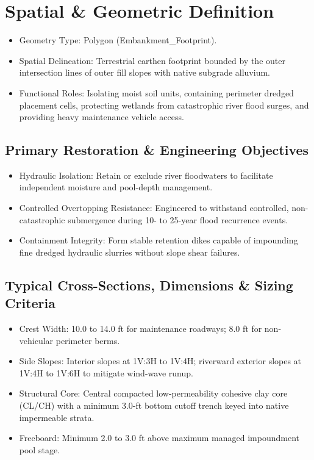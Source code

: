 \documentclass[
  letterpaper,
  DIV=11,
  numbers=noendperiod]{scrreprt}
\begin{document}
\section{Spatial \& Geometric
Definition}\label{spatial-geometric-definition-1}

\begin{itemize}
\item
  Geometry Type: Polygon (Embankment\_Footprint).
\item
  Spatial Delineation: Terrestrial earthen footprint bounded by the
  outer intersection lines of outer fill slopes with native subgrade
  alluvium.
\item
  Functional Roles: Isolating moist soil units, containing perimeter
  dredged placement cells, protecting wetlands from catastrophic river
  flood surges, and providing heavy maintenance vehicle access.
\end{itemize}

\subsection{Primary Restoration \& Engineering
Objectives}\label{primary-restoration-engineering-objectives}

\begin{itemize}
\item
  Hydraulic Isolation: Retain or exclude river floodwaters to facilitate
  independent moisture and pool-depth management.
\item
  Controlled Overtopping Resistance: Engineered to withstand controlled,
  non-catastrophic submergence during 10- to 25-year flood recurrence
  events.
\item
  Containment Integrity: Form stable retention dikes capable of
  impounding fine dredged hydraulic slurries without slope shear
  failures.
\end{itemize}

\subsection{Typical Cross-Sections, Dimensions \& Sizing
Criteria}\label{typical-cross-sections-dimensions-sizing-criteria-1}

\begin{itemize}
\item
  Crest Width: 10.0 to 14.0 ft for maintenance roadways; 8.0 ft for
  non-vehicular perimeter berms.
\item
  Side Slopes: Interior slopes at 1V:3H to 1V:4H; riverward exterior
  slopes at 1V:4H to 1V:6H to mitigate wind-wave runup.
\item
  Structural Core: Central compacted low-permeability cohesive clay core
  (CL/CH) with a minimum 3.0-ft bottom cutoff trench keyed into native
  impermeable strata.
\item
  Freeboard: Minimum 2.0 to 3.0 ft above maximum managed impoundment
  pool stage.
\end{itemize}
\end{document}
